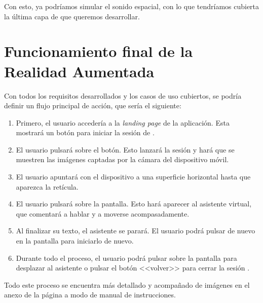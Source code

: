 \documentclass{subfiles}
\begin{document}
        Con esto, ya podríamos simular el sonido espacial, con lo que tendríamos cubierta la última capa de \ra que queremos desarrollar.

        \section{Funcionamiento final de la Realidad Aumentada}
        \label{sec:funcionamiento_final_de_la_realidad_aumentada}

        Con todos los requisitos desarrollados y los casos de uso cubiertos, se podría definir un flujo principal de acción, que sería el siguiente:

        \begin{enumerate}
            \item Primero, el usuario accedería a la \textit{landing page} de la aplicación. Esta mostrará un botón para iniciar la sesión de \ra.
            \item El usuario pulsará sobre el botón. Esto lanzará la sesión y hará que se muestren las imágenes captadas por la cámara del dispositivo móvil.
            \item El usuario apuntará con el dispositivo a una superficie horizontal hasta que aparezca la retícula.
            \item El usuario pulsará sobre la pantalla. Esto hará aparecer al asistente virtual, que comentará a hablar y a moverse acompasadamente.
            \item Al finalizar su texto, el asistente se parará. El usuario podrá pulsar de nuevo en la pantalla para iniciarlo de nuevo.
            \item Durante todo el proceso, el usuario podrá pulsar sobre la pantalla para desplazar al asistente o pulsar el botón <<volver>> para cerrar la sesión \ra.
        \end{enumerate}

        Todo este proceso se encuentra más detallado y acompañado de imágenes en el anexo de la página \pageref{sec:anexo_manual_de_uso} a modo de manual de instrucciones.
\end{document}
